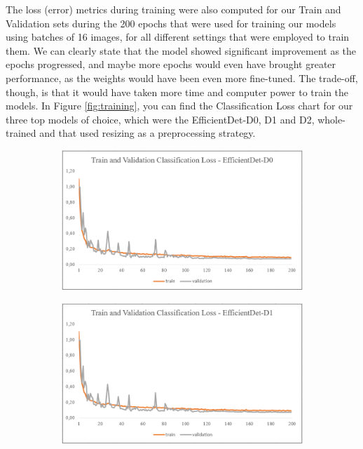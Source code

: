 \documentclass[openright]{normas-utf-tex} %
\begin{document}
The loss (error) metrics during training were also computed for our Train and Validation sets during the 
200 epochs that were used for training our models using batches of 16 images, for all different 
settings that were employed to train them. We can clearly state that the model showed significant
improvement as the epochs progressed, and maybe more epochs would even have brought greater performance,
as the weights would have been even more fine-tuned. The trade-off, though, is that it would have 
taken more time and computer power to train the models.
In Figure \ref{fig:training}, you can find the Classification Loss chart for our three top models of choice, which were
the EfficientDet-D0, D1 and D2, whole-trained and that used resizing as a preprocessing strategy.

\begin{figure}[H]
	\centering
    \begin{subfigure}{0.65\textwidth}
        \centering
        \includegraphics[width=1\textwidth]{./images/efficientdet-d0-resized-whole-loss.png}
        \caption{}
    \end{subfigure}
    \begin{subfigure}{0.65\textwidth}
        \centering
        \includegraphics[width=1\textwidth]{./images/efficientdet-d1-resized-whole-loss.png}

\end{subfigure}
\end{figure}
\end{document}
